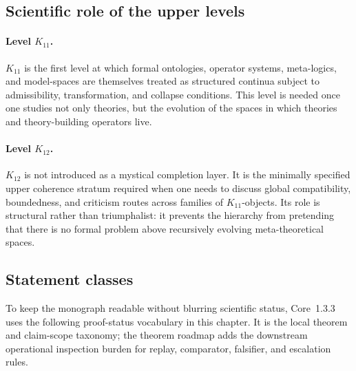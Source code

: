 \subsection{Scientific role of the upper levels}

\paragraph{Level \texorpdfstring{$K_{11}$}{K11}.}
\(K_{11}\) is the first level at which formal ontologies, operator systems,
meta-logics, and model-spaces are themselves treated as structured continua
subject to admissibility, transformation, and collapse conditions.
This level is needed once one studies not only theories, but the evolution of
the spaces in which theories and theory-building operators live.

\paragraph{Level \texorpdfstring{$K_{12}$}{K12}.}
\(K_{12}\) is not introduced as a mystical completion layer.
It is the minimally specified upper coherence stratum required when one needs
to discuss global compatibility, boundedness, and criticism routes across families
of \(K_{11}\)-objects.
Its role is structural rather than triumphalist: it prevents the hierarchy from
pretending that there is no formal problem above recursively evolving
meta-theoretical spaces.

\subsection{Statement classes}

To keep the monograph readable without blurring scientific status, Core~1.3.3 uses the
following proof-status vocabulary in this chapter. It is the local theorem and
claim-scope taxonomy; the theorem roadmap adds the
downstream operational inspection burden for replay, comparator, falsifier, and
escalation rules.


